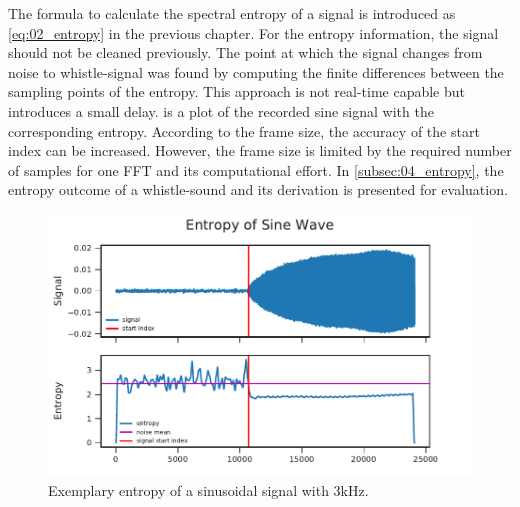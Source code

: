 The formula to calculate the spectral entropy of a signal is introduced as
\cref{eq:02_entropy} in the previous chapter.
For the entropy information, the signal should not be cleaned previously.
The point at which the signal changes from noise to whistle-signal was found by
computing the finite differences between the sampling points of the entropy.
This approach is not real-time capable but introduces a small delay.
 is a plot of the recorded sine signal with the corresponding
entropy.
According to the frame size, the accuracy of the start index can be increased.
However, the frame size is limited by the required number of samples for one \ac{FFT} and
its computational effort.
In \cref{subsec:04_entropy}, the entropy outcome of a whistle-sound
and its derivation is presented for evaluation.
\begin{figure}[ht]
	\centering
		\includegraphics[]{figures/sine_entropy}
	\caption{Exemplary entropy of a sinusoidal signal with 3\si{\kilo\hertz}.}
	\label{fig:03_entropy}
\end{figure}


